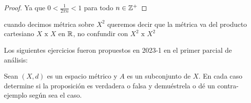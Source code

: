 \begin{itemize}
\begin{proof}
Ya que $0<\frac{1}{2\pi n}< 1$ para todo $n \in \mathbb{Z}^+$

    
\end{proof}  
   
   \begin{note}
   cuando decimos métrica sobre $X^2$ queremos decir que la métrica va del producto cartesiano $X \text{ x } X$ en $\mathbb{R}$, no confundir con $X^2 \text{ x } X^2$ 
   \end{note}
   


\begin{note}
Los siguientes ejercicios fueron propuestos en 2023-1 en el primer parcial de análisis:
\end{note}

\end{itemize}


Sean $(X, d)$ es un espacio métrico y $A$ es un subconjunto de $X$. En cada caso determine si la proposición es verdadera o falsa y demuéstrela o dé un contra-ejemplo según sea el caso.

